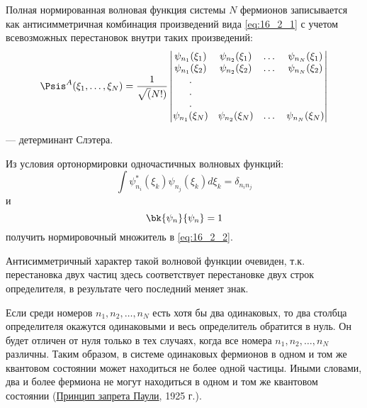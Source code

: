 Полная нормированная волновая функция системы $N$ фермионов записывается как антисимметричная комбинация произведений вида \eqref{eq:16_2_1} с учетом всевозможных перестановок внутри таких произведений:
\begin{equation}
\label{eq:16_2_2}
\Psis^A(\xi_1, \dots, \xi_N) = \frac{1}{\sqrt(N!)} \left |
  \begin{matrix} 
  \psi_{n_1}(\xi_1) & \psi_{n_2}(\xi_1) & \dots &  \psi_{n_N}(\xi_1) \\
  \psi_{n_1}(\xi_2) & \psi_{n_2}(\xi_2) & \dots &  \psi_{n_N}(\xi_2) \\
  .                                &                                  &    &                                    \\
  .                                &                                  &    &                                    \\
  .                                &                                  &    &                                    \\
  \psi_{n_1}(\xi_N) & \psi_{n_2}(\xi_N) & \dots &  \psi_{n_N}(\xi_N)
  \end{matrix} \right |
\end{equation}

--- детерминант Слэтера.
\begin{excr}
Из условия ортонормировки одночастичных волновых функций: 
$$
\int \psi_{n_i}^*(\xi_k) \psi_{n_j}(\xi_k) d\xi_k = \delta_{n_i n_j}
$$
и 
$$
\bk{\psi_n}{\psi_n} = 1
$$
получить нормировочный множитель в \eqref{eq:16_2_2}.
\end{excr}

Антисимметричный характер такой волновой функции очевиден, т.к. перестановка двух частиц здесь соответствует перестановке двух строк определителя, в результате чего последний меняет знак.

Если среди номеров $n_1, n_2, \dots, n_N$ есть хотя бы два одинаковых, то два столбца определителя окажутся одинаковыми и весь определитель обратится в нуль. Он будет отличен от нуля только в тех случаях, когда все номера $n_1, n_2, \dots, n_N$ различны. Таким образом, в системе одинаковых фермионов в одном и том же квантовом состоянии может находиться не более одной частицы. Иными словами, два и более фермиона не могут находиться в одном и том же квантовом состоянии (\underline{Принцип запрета Паули}, 1925 г.).